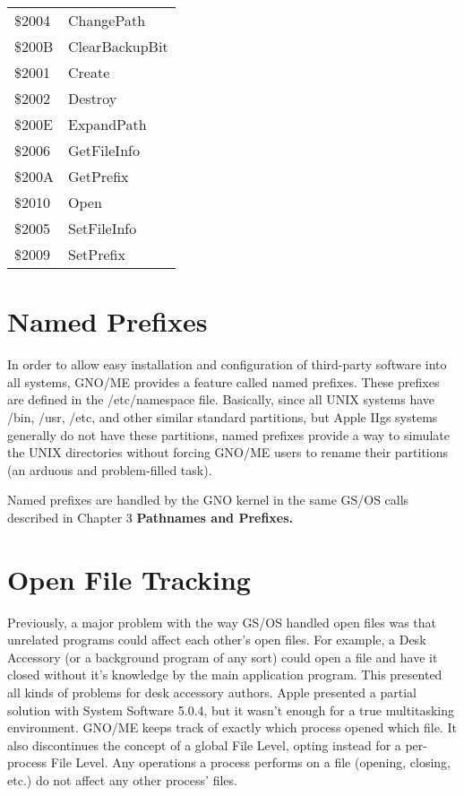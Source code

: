 \documentclass{report}
\begin{document}

\begin{tabular}{ll}
\$2004 & ChangePath \\
\$200B & ClearBackupBit \\
\$2001 & Create \\
\$2002 & Destroy \\
\$200E & ExpandPath \\
\$2006 & GetFileInfo \\
\$200A & GetPrefix \\
\$2010 & Open \\
\$2005 & SetFileInfo \\
\$2009 & SetPrefix \\
\end{tabular}


\section{Named Prefixes}

In order to allow easy installation and
configuration of third-party software into all systems, GNO/ME
provides a feature called named prefixes. These prefixes are
defined in the 
/etc/namespace file. Basically, since all UNIX
systems have /bin, /usr, /etc, and other similar standard
partitions, but Apple IIgs systems generally do not have these
partitions, named prefixes provide a way to simulate the UNIX
directories without forcing GNO/ME users to rename their
partitions (an arduous and problem-filled task).

Named prefixes are handled by the GNO
kernel in the same GS/OS calls described in Chapter 3 \bf Pathnames
and Prefixes\rm.

\section{Open File Tracking}

Previously, a major problem with the way
GS/OS handled open files was that unrelated programs could affect
each other's open files. For example, a Desk Accessory (or a
background program of any sort) could open a file and have it
closed without it's knowledge by the main application program.
This presented all kinds of problems for desk accessory authors.
Apple presented a partial solution with System Software 5.0.4,
but it wasn't enough for a true multitasking environment. GNO/ME
keeps track of exactly which process opened which file. It also
discontinues the concept of a global File Level, opting instead
for a per-process File Level. Any operations a process performs
on a file (opening, closing, etc.) do not affect any other
process' files.
\end{document}
